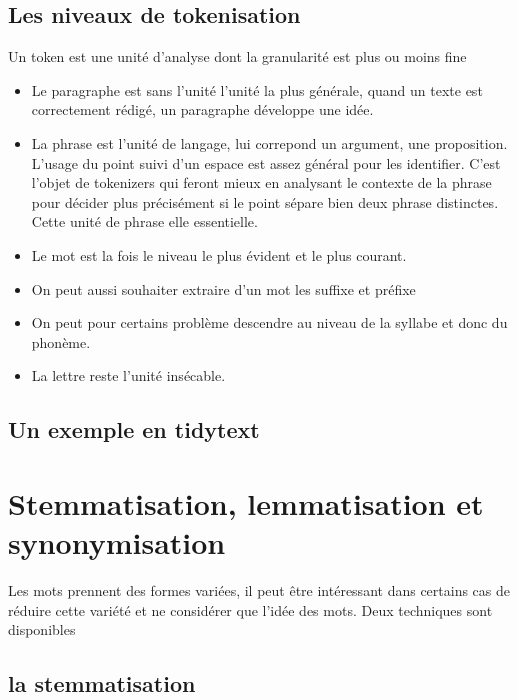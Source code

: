\documentclass[
]{book}
\providecommand{\tightlist}{%
  \setlength{\itemsep}{0pt}\setlength{\parskip}{0pt}}
\begin{document}
\hypertarget{les-niveaux-de-tokenisation}{%
\subsection{Les niveaux de tokenisation}\label{les-niveaux-de-tokenisation}}

Un token est une unité d'analyse dont la granularité est plus ou moins fine

\begin{itemize}
\tightlist
\item
  Le paragraphe est sans l'unité l'unité la plus générale, quand un texte est correctement rédigé, un paragraphe développe une idée.
\item
  La phrase est l'unité de langage, lui correpond un argument, une proposition. L'usage du point suivi d'un espace est assez général pour les identifier. C'est l'objet de tokenizers qui feront mieux en analysant le contexte de la phrase pour décider plus précisément si le point sépare bien deux phrase distinctes. Cette unité de phrase elle essentielle.
\item
  Le mot est la fois le niveau le plus évident et le plus courant.
\item
  On peut aussi souhaiter extraire d'un mot les suffixe et préfixe
\item
  On peut pour certains problème descendre au niveau de la syllabe et donc du phonème.
\item
  La lettre reste l'unité insécable.
\end{itemize}

\hypertarget{un-exemple-en-tidytext}{%
\subsection{Un exemple en tidytext}\label{un-exemple-en-tidytext}}

\hypertarget{stemmatisation-lemmatisation-et-synonymisation}{%
\section{Stemmatisation, lemmatisation et synonymisation}\label{stemmatisation-lemmatisation-et-synonymisation}}

Les mots prennent des formes variées, il peut être intéressant dans certains cas de réduire cette variété et ne considérer que l'idée des mots. Deux techniques sont disponibles

\hypertarget{la-stemmatisation}{%
\subsection{la stemmatisation}\label{la-stemmatisation}}
\end{document}
